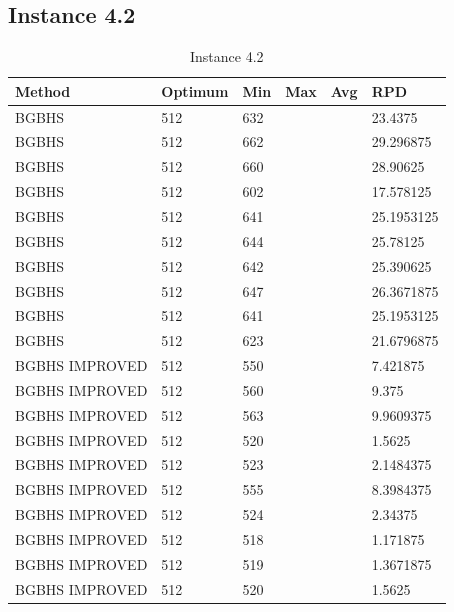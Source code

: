 \newpage
\subsection{Instance 4.2}

\begin{table}[H]
\centering
\begin{tabular}{ | l | l | l | l | l | l | }
\hline
	Method & Optimum & Min & Max & Avg & RPD \\ \hline
	BGBHS & 512 & 632 &  &  & 23.4375 \\ \hline
	BGBHS & 512 & 662 &  &  & 29.296875 \\ \hline
	BGBHS & 512 & 660 &  &  & 28.90625 \\ \hline
	BGBHS & 512 & 602 &  &  & 17.578125 \\ \hline
	BGBHS & 512 & 641 &  &  & 25.1953125 \\ \hline
	BGBHS & 512 & 644 &  &  & 25.78125 \\ \hline
	BGBHS & 512 & 642 &  &  & 25.390625 \\ \hline
	BGBHS & 512 & 647 &  &  & 26.3671875 \\ \hline
	BGBHS & 512 & 641 &  &  & 25.1953125 \\ \hline
	BGBHS & 512 & 623 &  &  & 21.6796875 \\ \hline
	BGBHS IMPROVED & 512 & 550 &  &  & 7.421875 \\ \hline
	BGBHS IMPROVED & 512 & 560 &  &  & 9.375 \\ \hline
	BGBHS IMPROVED & 512 & 563 &  &  & 9.9609375 \\ \hline
	BGBHS IMPROVED & 512 & 520 &  &  & 1.5625 \\ \hline
	BGBHS IMPROVED & 512 & 523 &  &  & 2.1484375 \\ \hline
	BGBHS IMPROVED & 512 & 555 &  &  & 8.3984375 \\ \hline
	BGBHS IMPROVED & 512 & 524 &  &  & 2.34375 \\ \hline
	BGBHS IMPROVED & 512 & 518 &  &  & 1.171875 \\ \hline
	BGBHS IMPROVED & 512 & 519 &  &  & 1.3671875 \\ \hline
	BGBHS IMPROVED & 512 & 520 &  &  & 1.5625 \\ \hline
\end{tabular}
\caption{Instance 4.2}
\label{tblscp42}
\end{table}

\newpage
